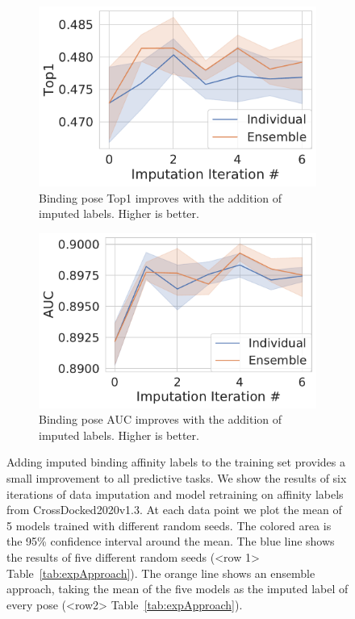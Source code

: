 \documentclass[journal=jmcmar,manuscript=article]{achemso}
\begin{document}
\begin{figure}[tbph]
    \begin{subfigure}[t]{0.48\textwidth}
        \centering
        \includegraphics[width=\linewidth]{figures/InitialImpTop1.pdf}
        \caption{Binding pose Top1 improves with the addition of imputed labels. Higher is better.}
    \end{subfigure}
    \hfill
    \begin{subfigure}[t]{0.48\textwidth}
        \centering
        \includegraphics[width=\linewidth]{figures/InitialImpAUC.pdf}
        \caption{Binding pose AUC improves with the addition of imputed labels. Higher is better.}
    \end{subfigure}
    \caption{Adding imputed binding affinity labels to the training set provides a small improvement to all predictive tasks. We show the results of six iterations of data imputation and model retraining on affinity labels from CrossDocked2020v1.3. At each data point we plot the mean of 5 models trained with different random seeds. The colored area is the 95\% confidence interval around the mean. The blue line shows the results of five different random seeds (<row 1> Table~\ref{tab:expApproach}). The orange line shows an ensemble approach, taking the mean of the five models as the imputed label of every pose (<row2> Table~\ref{tab:expApproach}).}
    \label{fig:initialImp}
\end{figure}
\end{document}

